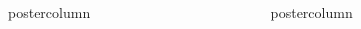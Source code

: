 \documentclass[final,hyperref={pdfpagelabels=false}]{beamer}
\newlength{\columnheight}
\begin{document}
\begin{frame}
\begin{columns}
\begin{column}{.49\textwidth}
\begin{beamercolorbox}[center,wd=\textwidth]{postercolumn}
\begin{minipage}[T]{.95\textwidth}
{              \vspace*{\fill}
                }
              \end{minipage}
            \end{beamercolorbox}
          \end{column}

    \begin{column}{.49\textwidth}
      \begin{beamercolorbox}[center,wd=\textwidth]{postercolumn}
        \begin{minipage}[T]{.95\textwidth} 
          \parbox[t][\columnheight]{\textwidth}{
            
}
\end{minipage}
\end{beamercolorbox}
\end{column}
\end{columns}
\end{frame}
\end{document}
